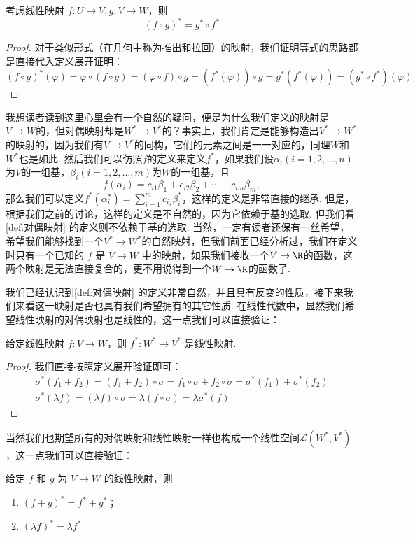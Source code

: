 \begin{lemma}{}{}
    考虑线性映射 $f\colon U \to V, g: V \to W$，则
    \[
        (f \circ g)^* = g^* \circ f^*
    \]
\end{lemma}

\begin{proof}
    对于类似形式（在几何中称为推出和拉回）的映射，我们证明等式的思路都是直接代入定义展开证明：
    \[
        (f \circ g)^* (\varphi) = \varphi \circ (f \circ g) = (\varphi \circ f) \circ g = (f^*(\varphi)) \circ g = g^* (f^*(\varphi)) = (g^* \circ f^*)(\varphi)
    \]
\end{proof}

我想读者读到这里心里会有一个自然的疑问，便是为什么我们定义的映射是$V\to W$的，但对偶映射却是$W^*\to V^*$的？事实上，我们肯定是能够构造出$V^*\to W^*$的映射的，因为我们有$V\to V^*$的同构，它们的元素之间是一一对应的，同理$W$和$W^*$也是如此. 然后我们可以仿照$f$的定义来定义$f^*$，如果我们设$\alpha_i(i=1,2,\ldots,n)$为$V$的一组基，$\beta_i(i=1,2,\ldots,m)$为$W$的一组基，且
\[f(\alpha_i)=c_{i1}\beta_1+c_{i2}\beta_2+\cdots+c_{im}\beta_m,\]
那么我们可以定义$f^*(\alpha_i^*)=\sum\limits_{i=1}^m c_{ij}\beta_i^*$，这样的定义是非常直接的继承. 但是，根据我们之前的讨论，这样的定义是不自然的，因为它依赖于基的选取. 但我们看\autoref{def:对偶映射} 的定义则不依赖于基的选取. 当然，一定有读者还保有一丝希望，希望我们能够找到一个$V^*\to W^*$的自然映射，但我们前面已经分析过，我们在定义时只有一个已知的 $f$ 是 $V\to W$ 中的映射，如果我们接收一个$V\to \R$的函数，这两个映射是无法直接复合的，更不用说得到一个$W\to \R$的函数了.

我们已经认识到\autoref{def:对偶映射} 的定义非常自然，并且具有反变的性质，接下来我们来看这一映射是否也具有我们希望拥有的其它性质. 在线性代数中，显然我们希望线性映射的对偶映射也是线性的，这一点我们可以直接验证：
\begin{lemma}{}{}
    给定线性映射 $f\colon V \to W$，则 $f^*: W^* \to V^*$ 是线性映射.
\end{lemma}
\begin{proof}
    我们直接按照定义展开验证即可：
    \begin{gather*}
        \sigma^*(f_1+f_2)=(f_1+f_2)\circ\sigma=f_1\circ\sigma+f_2\circ\sigma=\sigma^*(f_1)+\sigma^*(f_2) \\
        \sigma^*(\lambda f)=(\lambda f)\circ\sigma=\lambda(f\circ\sigma)=\lambda\sigma^*(f)
    \end{gather*}
\end{proof}

当然我们也期望所有的对偶映射和线性映射一样也构成一个线性空间$\mathcal{L}(W^*,V^*)$，这一点我们可以直接验证：
\begin{lemma}{}{}
    给定 $f$ 和 $g$ 为 $V \to W$ 的线性映射，则
    \begin{enumerate}
        \item $(f + g)^* = f^* + g^*$；
        \item $(\lambda f)^* = \lambda f^*$.
    \end{enumerate}
\end{lemma}

